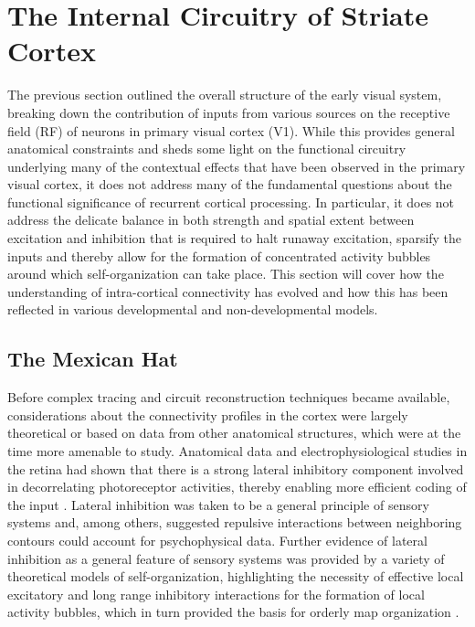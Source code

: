 \section{The Internal Circuitry of Striate Cortex}

The previous section outlined the overall structure of the early visual
system, breaking down the contribution of inputs from various sources
on the receptive field (RF) of neurons in primary visual cortex
(V1). While this provides general anatomical constraints and sheds
some light on the functional circuitry underlying many of the
contextual effects that have been observed in the primary visual
cortex, it does not address many of the fundamental questions about
the functional significance of recurrent cortical processing. In
particular, it does not address the delicate balance in both strength
and spatial extent between excitation and inhibition that is required
to halt runaway excitation, sparsify the inputs and thereby allow for
the formation of concentrated activity bubbles around which
self-organization can take place. This section will cover how the
understanding of intra-cortical connectivity has evolved and how this
has been reflected in various developmental and non-developmental
models.

\subsection{The Mexican Hat}

Before complex tracing and circuit reconstruction techniques became
available, considerations about the connectivity profiles in the
cortex were largely theoretical or based on data from other anatomical
structures, which were at the time more amenable to study. Anatomical
data and electrophysiological studies in the retina had shown that
there is a strong lateral inhibitory component involved in
decorrelating photoreceptor activities, thereby enabling more
efficient coding of the input \citep{Atick1992}. Lateral inhibition
was taken to be a general principle of sensory systems and, among
others, \cite{Blakemore1970} suggested repulsive interactions between
neighboring contours could account for psychophysical data. Further
evidence of lateral inhibition as a general feature of sensory systems
was provided by a variety of theoretical models of self-organization,
highlighting the necessity of effective local excitatory and long
range inhibitory interactions for the formation of local activity
bubbles, which in turn provided the basis for orderly map organization
\citep{VonderMalsburg1973,Miller1989}.

